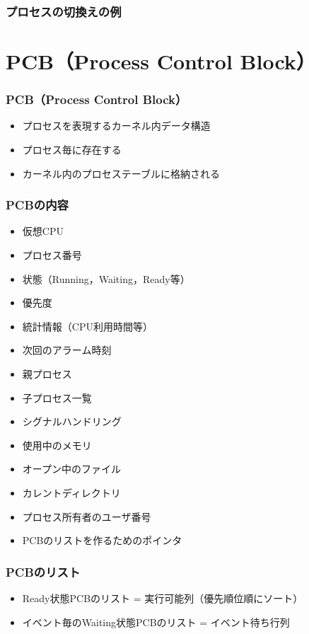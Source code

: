 \documentclass[unicode,handout]{beamer}                   %
\begin{document}
\begin{frame}
  \frametitle{プロセスの切換えの例}
\end{frame}

\section{PCB（Process Control Block）}
\begin{frame}
  \frametitle{PCB（Process Control Block）}
  \begin{itemize}
    \item プロセスを表現するカーネル内データ構造
    \item プロセス毎に存在する
    \item カーネル内のプロセステーブルに格納される
  \end{itemize}
  \vfill
\end{frame}

\begin{frame}
  \frametitle{PCBの内容}
\begin{itemize}
\item 仮想CPU
\item プロセス番号
\item 状態（Running，Waiting，Ready等）
\item 優先度
\item 統計情報（CPU利用時間等）
\item 次回のアラーム時刻
\item 親プロセス
\item 子プロセス一覧
\item シグナルハンドリング
\item 使用中のメモリ
\item オープン中のファイル
\item カレントディレクトリ
\item プロセス所有者のユーザ番号
\item PCBのリストを作るためのポインタ
\end{itemize}
\end{frame}

\begin{frame}
  \frametitle{PCBのリスト}
  \begin{itemize}
    \item Ready状態PCBのリスト = 実行可能列（優先順位順にソート）
    \item イベント毎のWaiting状態PCBのリスト = イベント待ち行列
  \end{itemize}
  \vfill
\end{frame}
\end{document}
